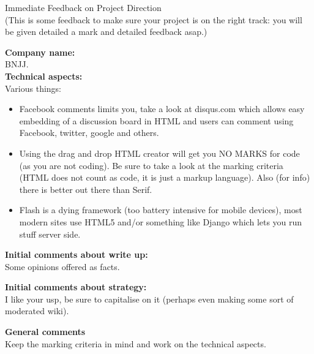\documentclass{article}
\begin{document}
\begin{center}
\Huge{Immediate Feedback on Project Direction}\\
\tiny{(This is some feedback to make sure your project is on the right track: you will be given detailed a mark and detailed feedback asap.)}
\end{center}


\normalsize
\textbf{Company name:}\\

BNJJ. \\

\textbf{Technical aspects:}\\

Various things:

\begin{itemize}
    \item Facebook comments limits you, take a look at disqus.com which allows easy embedding of a discussion board in HTML and users can comment using Facebook, twitter, google and others.
    \item Using the drag and drop HTML creator will get you NO MARKS for code (as you are not coding). Be sure to take a look at the marking criteria (HTML does not count as code, it is just a markup language). Also (for info) there is better out there than Serif.
    \item Flash is a dying framework (too battery intensive for mobile devices), most modern sites use HTML5 and/or something like Django which lets you run stuff server side.
\end{itemize}

\textbf{Initial comments about write up:}\\

Some opinions offered as facts.

\textbf{Initial comments about strategy:}\\

I like your usp, be sure to capitalise on it (perhaps even making some sort of moderated wiki).

\textbf{General comments}\\

Keep the marking criteria in mind and work on the technical aspects.
\end{document}
